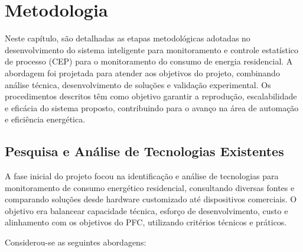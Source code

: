 \chapter{Metodologia}

Neste capítulo, são detalhadas as etapas metodológicas adotadas no desenvolvimento do sistema inteligente para monitoramento e controle estatístico de processo (CEP) para o monitoramento do consumo de energia residencial. A abordagem foi projetada para atender aos objetivos do projeto, combinando análise técnica, desenvolvimento de soluções e validação experimental. Os procedimentos descritos têm como objetivo garantir a reprodução, escalabilidade e eficácia do sistema proposto, contribuindo para o avanço na área de automação e eficiência energética.

\section{Pesquisa e Análise de Tecnologias Existentes}
\label{sec:pesquisa_tecnologias}

A fase inicial do projeto focou na identificação e análise de tecnologias para monitoramento de consumo energético residencial, consultando diversas fontes e comparando soluções desde hardware customizado até dispositivos comerciais. O objetivo era balancear capacidade técnica, esforço de desenvolvimento, custo e alinhamento com os objetivos do PFC, utilizando critérios técnicos e práticos.

Considerou-se as seguintes abordagens:

